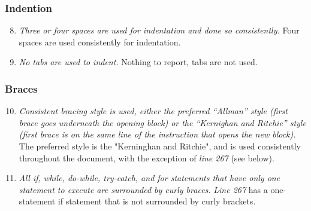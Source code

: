 	\subsubsection{Indention}
		\begin{enumerate}
			\setcounter{enumi}{7}
			\item \textit{Three or four spaces are used for indentation and done so consistently.}\newline
			Four spaces are used consistently for indentation. 

			\item \textit{No tabs are used to indent.}\newline
			Nothing to report, tabs are not used. 

		\end{enumerate}

	\subsubsection{Braces}
		\begin{enumerate}
			\setcounter{enumi}{9}
			\item \textit{Consistent bracing style is used, either the preferred “Allman” style (first brace goes underneath the opening block) or the “Kernighan and Ritchie” style (first brace is on the same line of the instruction that opens the new block).}\newline
			The preferred style is the "Kerninghan and Ritchie", and is used consistently throughout the document, with the exception of \textit{line 267} (see below). %

			\item \textit{All if, while, do-while, try-catch, and for statements that have only one statement to execute are surrounded by curly braces.}
			\textit{Line 267} has a one-statement if statement that is not surrounded by curly brackets. 
			
		\end{enumerate}


